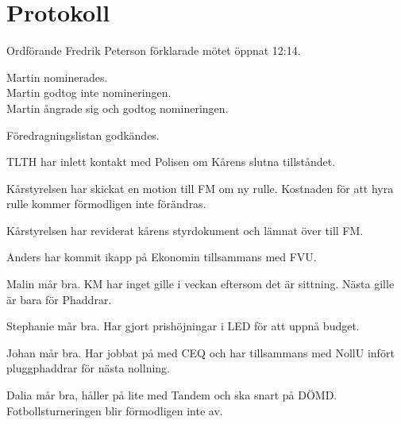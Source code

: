\documentclass[10pt]{article}
\def\mo{Fredrik Peterson}
\begin{document}
\section*{Protokoll}
\begin{paragrafer}
Ordförande {\mo} förklarade mötet öppnat 12:14.

\valavmo

\valavms

\tosg

\ingaadj

Martin nominerades.\\
Martin godtog inte nomineringen.\\
Martin ångrade sig och godtog nomineringen.

\valavj

Föredragningslistan godkändes.

\begin{fyllnadsval} %
\end{fyllnadsval}


\begin{paragrafer}
TLTH har inlett kontakt med Polisen om Kårens slutna tillståndet.

Kårstyrelsen har skickat en motion till FM om ny rulle. Kostnaden för att hyra rulle kommer förmodligen inte förändras.

Kårstyrelsen har reviderat kårens styrdokument och lämnat över till FM.

Anders har kommit ikapp på Ekonomin tillsammans med FVU.

Malin mår bra. KM har inget gille i veckan eftersom det är sittning. Nästa gille är bara för Phaddrar.

Stephanie mår bra. Har gjort prishöjningar i LED för att uppnå budget.

Johan mår bra. Har jobbat på med CEQ och har tillsammans med NollU infört pluggphaddrar för nästa nollning.

Dalia mår bra, håller på lite med Tandem och ska snart på DÖMD. Fotbollsturneringen blir förmodligen inte av.


\end{paragrafer}
\end{paragrafer}
\end{document}
